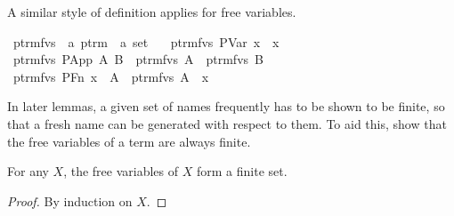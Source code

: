 A similar style of definition applies for free variables.

\begin{implementation}
\isamarkupfalse%
\ ptrm{\isacharunderscore}fvs\ {\isacharcolon}{\isacharcolon}\ {\isachardoublequoteopen}{\isacharprime}a\ ptrm\ {\isasymRightarrow}\ {\isacharprime}a\ set{\isachardoublequoteclose}\ \isanewline
\ \ {\isachardoublequoteopen}ptrm{\isacharunderscore}fvs\ {\isacharparenleft}PVar\ x{\isacharparenright}\ {\isacharequal}\ {\isacharbraceleft}x{\isacharbraceright}{\isachardoublequoteclose}\isanewline
{\isacharbar}\ {\isachardoublequoteopen}ptrm{\isacharunderscore}fvs\ {\isacharparenleft}PApp\ A\ B{\isacharparenright}\ {\isacharequal}\ ptrm{\isacharunderscore}fvs\ A\ {\isasymunion}\ ptrm{\isacharunderscore}fvs\ B{\isachardoublequoteclose}\isanewline
{\isacharbar}\ {\isachardoublequoteopen}ptrm{\isacharunderscore}fvs\ {\isacharparenleft}PFn\ x\ {\isacharunderscore}\ A{\isacharparenright}\ {\isacharequal}\ ptrm{\isacharunderscore}fvs\ A\ {\isacharminus}\ {\isacharbraceleft}x{\isacharbraceright}{\isachardoublequoteclose}\isanewline
\end{implementation}

In later lemmas, a given set of names frequently has to be shown to be finite, so that a fresh name can be generated with respect to them.
To aid this, show that the free variables of a term are always finite.
\begin{lemma}
For any \(X\), the free variables of \(X\) form a finite set.
\end{lemma}
\begin{proof}
By induction on \(X\).
\end{proof}

